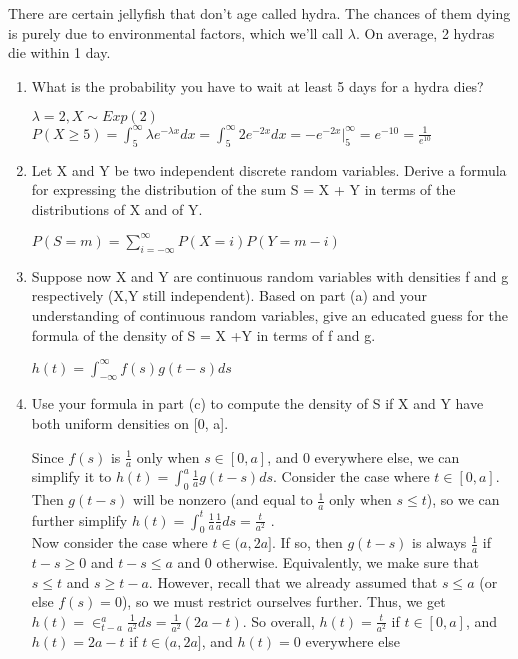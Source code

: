 \question There are certain jellyfish that don’t age called hydra. The 
chances of them dying is purely due to environmental factors, which 
we’ll call $\lambda$. On average, 2 hydras die within 1 day.
\begin{enumerate}[label=(\alph*)]
\item What is the probability you have to wait at least 5 days for a 
hydra dies?
\begin{solution}[2.5cm]
$\lambda = 2, X \sim Exp(2)$ \\
$P(X\geq 5) = \int_5^\infty \lambda e^{-\lambda x} dx = \int_5^\infty 
2e^{-2x} dx = -e^{-2x} |_5^\infty = e^{-10} = \frac{1}{e^{10}}$
\end{solution}

\item
Let X and Y be two independent discrete random variables. Derive a 
formula for expressing the distribution of the sum S = X + Y in terms 
of the distributions of X and of Y.
\begin{solution}[2.5cm]
$P(S=m) = \sum_{i=-\infty}^\infty P(X = i)P(Y=m-i)$
\end{solution}

\item  Suppose now X and Y are continuous random variables with 
densities f and g respectively (X,Y still independent). Based on part 
(a) and your understanding of continuous random variables, give an 
educated guess for the formula of the density of S = X +Y in terms of f and g.
\begin{solution}[2cm]
$ h(t) = \int_{-\infty}^\infty f(s) g(t-s) ds $
\end{solution}

\item Use your formula in part (c) to compute the density of S if X 
and Y have both uniform densities on [0, a].
\begin{solution}
Since $f(s)$ is $\frac{1}{a}$ only when $s \in [0, a]$, and 0 everywhere 
else, we can simplify it to $h(t) = \int_0^a \frac{1}{a} g(t-s) ds$. 
Consider the case where $t \in [0,a]$. Then $g(t-s)$ will be nonzero 
(and equal to $\frac{1}{a}$ only when $s \leq t$), so we can further 
simplify $h(t) = \int_0^t \frac{1}{a} \frac{1}{a} ds = \frac{t}{a^2}$ . \\
Now consider the case where $t \in (a, 2a]$. If so, then $g(t-s)$ is 
always $\frac{1}{a}$ if $t-s\geq 0$ and $t-s\leq a$ and 0 otherwise. 
Equivalently, we make sure that $s\leq t$ and $s \geq t-a$. However, 
recall that we already assumed that $s \leq a$ (or else $f(s) = 0$), 
so we must restrict ourselves further. Thus, we get $h(t) = \in_{t-a}^a 
\frac{1}{a^2} ds = \frac{1}{a^2} (2a-t)$. So overall, $h(t) = 
\frac{t}{a^2}$ if $t \in [0, a]$, and $h(t) = 2a-t$ if $t \in (a, 2a]$, 
and $h(t) = 0$ everywhere else

\end{solution}

\end{enumerate}
